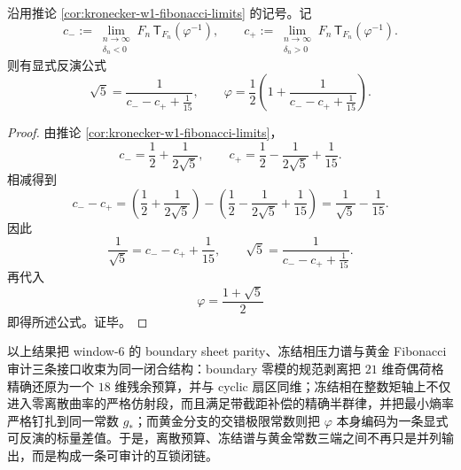 \begin{theorem}\label{thm:conclusion-golden-alternating-constants-recover-phi}
沿用推论 \ref{cor:kronecker-w1-fibonacci-limits} 的记号。记
\[
c_-:=
\lim_{\substack{n\to\infty\\ \delta_n<0}}
F_n\,\mathsf T_{F_n}(\varphi^{-1}),
\qquad
c_+:=
\lim_{\substack{n\to\infty\\ \delta_n>0}}
F_n\,\mathsf T_{F_n}(\varphi^{-1}).
\]
则有显式反演公式
\[
\boxed{\;
\sqrt5
=
\frac{1}{c_- - c_+ + \frac1{15}},
\qquad
\varphi
=
\frac12\left(1+\frac{1}{c_- - c_+ + \frac1{15}}\right).\;}
\]
\end{theorem}
\begin{proof}
由推论 \ref{cor:kronecker-w1-fibonacci-limits}，
\[
c_-=\frac12+\frac{1}{2\sqrt5},
\qquad
c_+=\frac12-\frac{1}{2\sqrt5}+\frac1{15}.
\]
相减得到
\[
c_- - c_+
=
\left(\frac12+\frac{1}{2\sqrt5}\right)
-
\left(\frac12-\frac{1}{2\sqrt5}+\frac1{15}\right)
=
\frac1{\sqrt5}-\frac1{15}.
\]
因此
\[
\frac1{\sqrt5}=c_- - c_+ + \frac1{15},
\qquad
\sqrt5=\frac{1}{c_- - c_+ + \frac1{15}}.
\]
再代入
\[
\varphi=\frac{1+\sqrt5}{2}
\]
即得所述公式。证毕。
\end{proof}

\noindent
以上结果把 window-\(6\) 的 boundary sheet parity、冻结相压力谱与黄金 Fibonacci 审计三条接口收束为同一闭合结构：boundary 零模的规范剥离把 \(21\) 维奇偶荷格精确还原为一个 \(18\) 维残余预算，并与 cyclic 扇区同维；冻结相在整数矩轴上不仅进入零离散曲率的严格仿射段，而且满足带截距补偿的精确半群律，并把最小熵率严格钉扎到同一常数 \(g_*\)；而黄金分支的交错极限常数则把 \(\varphi\) 本身编码为一条显式可反演的标量差值。于是，离散预算、冻结谱与黄金常数三端之间不再只是并列输出，而是构成一条可审计的互锁闭链。

\endinput
